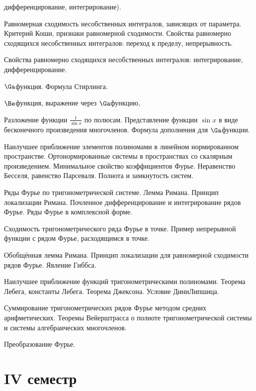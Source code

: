 \documentclass[a4paper]{article}
\begin{document}
\begin{nums}{-3}
дифференцирование, интегрирование).
\item Равномерная сходимость несобственных интегралов, зависящих от параметра. Критерий Коши,
признаки равномерной сходимости.   Свойства равномерно сходящихся несобственных интегралов: переход к
пределу, непрерывность.
\item Свойства равномерно сходящихся несобственных интегралов: интегрирование, дифференцирование.
\item $\Ga$\д функция. Формула Стирлинга.
\item $\Be$\д функция, выражение через $\Ga$\д функцию,
\item Разложение функции $\frac{1}{\sin x}$ по полюсам. Представление функции $\sin x$ в виде бесконечного
произведения многочленов. Формула дополнения для $\Ga$\д функции.
\item Наилучшее приближение элементов полиномами в линейном нормированном пространстве. Ортонормированные
системы в пространствах со скалярным произведением. Минимальное свойство коэффициентов Фурье.
Неравенство Бесселя, равенство Парсеваля. Полнота и замкнутость систем.
\item Ряды Фурье по тригонометрической системе. Лемма Римана. Принцип локализации Римана. Почленное
дифференцирование и интегрирование рядов Фурье. Ряды Фурье в комплексной форме.
\item Сходимость тригонометрического ряда Фурье в точке. Пример непрерывной функции с рядом
Фурье, расходящимся в точке.
\item Обобщённая лемма Римана. Принцип локализации для равномерной сходимости рядов Фурье. Явление Гиббса.
\item Наилучшее приближение функций тригонометрическими полиномами. Теорема Лебега, константы Лебега.
Теорема Джексона. Условие Дини\ч Липшица.
\item Суммирование тригонометрических рядов Фурье методом средних арифметических. Теоремы Вейерштрасса
о полноте тригонометрической системы и системы алгебраических многочленов.
\item Преобразование Фурье.
\end{nums}

\pagebreak

\section*{IV семестр}
\end{document}

